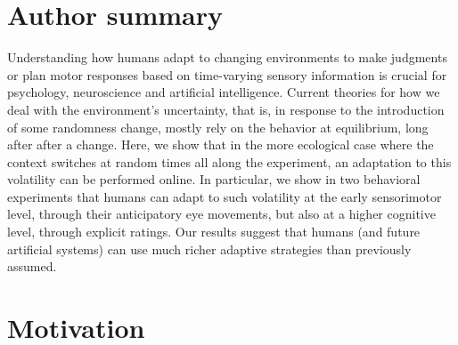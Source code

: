 \documentclass[10pt,letterpaper]{article}
\begin{document}
\section*{Author summary}
Understanding how humans adapt to changing environments to make judgments or plan motor responses based on time-varying sensory information is crucial for psychology, neuroscience and artificial intelligence. Current theories for how we deal with the environment's uncertainty, that is, in response to the introduction of some randomness change, mostly rely on the behavior at equilibrium, long after after a change. Here, we show that in the more ecological case where the context switches at random times all along the experiment, an adaptation to this volatility can be performed online. In particular, we show in two behavioral experiments that humans can adapt to such volatility at the early sensorimotor level, through their anticipatory eye movements, but also at a higher cognitive level, through explicit ratings. Our results suggest that humans (and future artificial systems) can use much richer adaptive strategies than previously assumed.
\section{Motivation}
\label{sec:intro}
\end{document}
